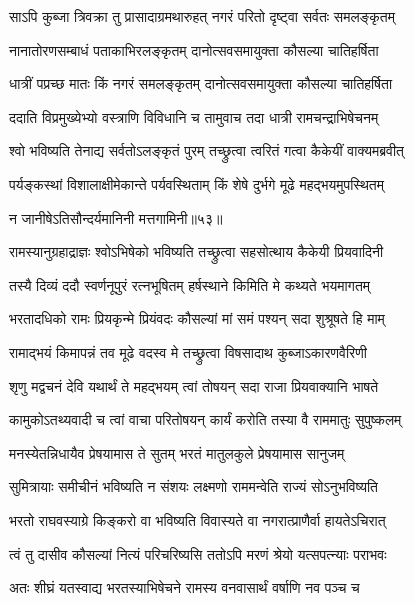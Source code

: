 \twolineshloka
{साऽपि कुब्जा त्रिवक्रा तु प्रासादाग्रमथारुहत्}
{नगरं परितो दृष्ट्वा सर्वतः समलङ्कृतम्} %

\twolineshloka
{नानातोरणसम्बाधं पताकाभिरलङ्कृतम्}
{दानोत्सवसमायुक्ता कौसल्या चातिहर्षिता} %

\twolineshloka
{धात्रीं पप्रच्छ मातः किं नगरं समलङ्कृतम्}
{दानोत्सवसमायुक्ता कौसल्या चातिहर्षिता} %

\twolineshloka
{ददाति विप्रमुख्येभ्यो वस्त्राणि विविधानि च}
{तामुवाच तदा धात्री रामचन्द्राभिषेचनम्} %

\twolineshloka
{श्वो भविष्यति तेनाद्य सर्वतोऽलङ्कृतं पुरम्}
{तच्छ्रुत्वा त्वरितं गत्वा कैकेयीं वाक्यमब्रवीत्} %

\twolineshloka
{पर्यङ्कस्थां विशालाक्षीमेकान्ते पर्यवस्थिताम्}
{किं शेषे दुर्भगे मूढे महद्भयमुपस्थितम्} %

{न जानीषेऽतिसौन्दर्यमानिनी मत्तगामिनी॥५३॥} %


\twolineshloka
{रामस्यानुग्रहाद्राज्ञः श्वोऽभिषेको भविष्यति}
{तच्छ्रुत्वा सहसोत्थाय कैकेयी प्रियवादिनी} %

\twolineshloka
{तस्यै दिव्यं ददौ स्वर्णनूपुरं रत्नभूषितम्}
{हर्षस्थाने किमिति मे कथ्यते भयमागतम्} %

\twolineshloka
{भरतादधिको रामः प्रियकृन्मे प्रियंवदः}
{कौसल्यां मां समं पश्यन् सदा शुश्रूषते हि माम्} %

\twolineshloka
{रामाद्भयं किमापन्नं तव मूढे वदस्व मे}
{तच्छ्रुत्वा विषसादाथ कुब्जाऽकारणवैरिणी} %

\twolineshloka
{शृणु मद्वचनं देवि यथार्थं ते महद्भयम्}
{त्वां तोषयन् सदा राजा प्रियवाक्यानि भाषते} %

\twolineshloka
{कामुकोऽतथ्यवादी च त्वां वाचा परितोषयन्}
{कार्यं करोति तस्या वै राममातुः सुपुष्कलम्} %

\twolineshloka
{मनस्येतन्निधायैव प्रेषयामास ते सुतम्}
{भरतं मातुलकुले प्रेषयामास सानुजम्} %

\twolineshloka
{सुमित्रायाः समीचीनं भविष्यति न संशयः}
{लक्ष्मणो राममन्वेति राज्यं सोऽनुभविष्यति} %

\twolineshloka
{भरतो राघवस्याग्रे किङ्करो वा भविष्यति}
{विवास्यते वा नगरात्प्राणैर्वा हायतेऽचिरात्} %

\twolineshloka
{त्वं तु दासीव कौसल्यां नित्यं परिचरिष्यसि}
{ततोऽपि मरणं श्रेयो यत्सपत्न्याः पराभवः} %

\twolineshloka
{अतः शीघ्रं यतस्वाद्य भरतस्याभिषेचने}
{रामस्य वनवासार्थं वर्षाणि नव पञ्च च} %

